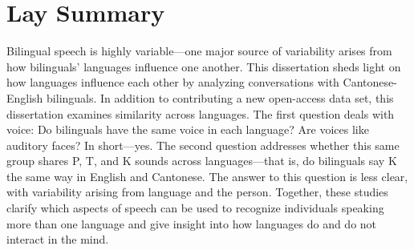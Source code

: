 
\chapter{Lay Summary}

Bilingual speech is highly variable---one major source of variability arises from how bilinguals' languages influence one another. This dissertation sheds light on how languages influence each other by analyzing conversations with Cantonese-English bilinguals. In addition to contributing a new open-access data set, this dissertation examines similarity across languages. The first question deals with voice: Do bilinguals have the same voice in each language? Are voices like auditory faces? In short---yes. The second question addresses whether this same group shares P, T, and K sounds across languages---that is, do bilinguals say K the same way in English and Cantonese. The answer to this question is less clear, with variability arising from language and the person. Together, these studies clarify which aspects of speech can be used to recognize individuals speaking more than one language and give insight into how languages do and do not interact in the mind. 
 

\endinput %
